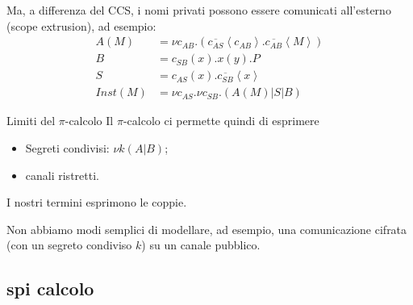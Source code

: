 \documentclass{beamer}
\theoremstyle{plain}
\theoremstyle{definition}
\theoremstyle{remark}
\newcommand{\obar}[1]{\overline{#1}}
\newcommand{\pa}[1]{\left(#1\right)}
\newcommand{\ang}[1]{\left<#1\right>}
\begin{document}
\begin{frame}
  Ma, a differenza del CCS, i nomi privati possono essere comunicati
  all'esterno (scope extrusion), ad esempio:
  \begin{align*}
    A(M) & = \nu
           c_{AB}. \pa{\obar{c_{AS}}\ang{c_{AB}}. \obar{c_{AB}}\ang{M}}
    \\
    B & = c_{SB}(x). x(y) .P \\
    S & = c_{AS}(x) . \obar{c_{SB}} \ang{x} \\
    Inst(M) & = \nu c_{AS}. \nu c_{SB}. \pa{ A(M) | S | B}
  \end{align*}
  \begin{center}
  \end{center}
\end{frame}

\begin{frame}{Limiti del $\pi$-calcolo}
  Il $\pi$-calcolo ci permette quindi di esprimere
  \begin{itemize}
  \item Segreti condivisi: $\nu k ( A|B)$;
  \item canali ristretti.
  \end{itemize}
  I nostri termini esprimono le coppie. 
  \vfill

  Non abbiamo modi semplici di modellare, ad esempio, una
  comunicazione cifrata (con un segreto condiviso $k$) su un canale
  pubblico.
\end{frame}

\subsection{spi calcolo}
\end{document}
